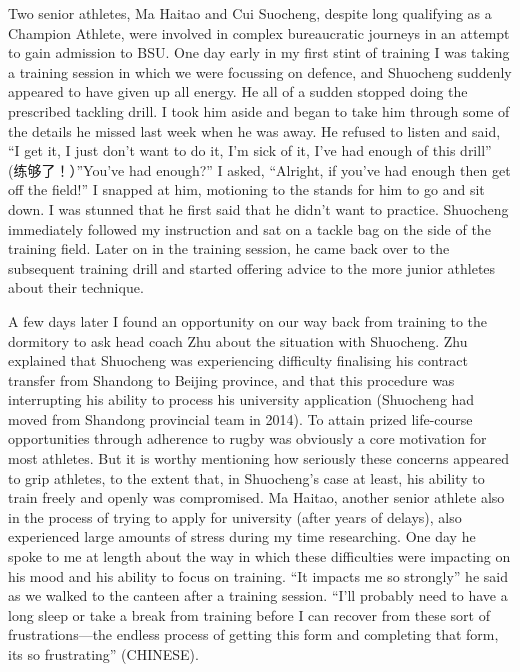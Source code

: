 \begin{CJK}{UTF8}{gbsn}
Two senior athletes, Ma Haitao and Cui Suocheng, despite long qualifying as a Champion Athlete, were involved in complex bureaucratic journeys in an attempt to gain admission to BSU.  One day early in my first stint of training I was taking a training session in which we were focussing on defence, and Shuocheng suddenly appeared to have given up all energy.  He all of a sudden stopped doing the prescribed tackling drill.  I took him aside and began to take him through some of the details he missed last week when he was away.  He refused to listen and said, ``I get it, I just don’t want to do it, I’m sick of it, I’ve had enough of this drill'' (练够了！）''You’ve had enough?'' I asked, ``Alright, if you’ve had enough then get off the field!''  I snapped at him, motioning to the stands for him to go and sit down. I was stunned that he first said that he didn’t want to practice.  Shuocheng immediately followed my instruction and sat on a tackle bag on the side of the training field.  Later on in the training session, he came back over to the subsequent training drill and started offering advice to the more junior athletes about their technique.

A few days later I found an opportunity on our way back from training to the dormitory to ask head coach Zhu about the situation with Shuocheng.  Zhu explained that Shuocheng was experiencing difficulty finalising his contract transfer from Shandong to Beijing province, and that this procedure was interrupting his ability to process his university application (Shuocheng had moved from Shandong provincial team in 2014). To attain prized life-course opportunities through adherence to rugby was obviously a core motivation for most athletes.  But it is worthy mentioning how seriously these concerns appeared to grip athletes, to the extent that, in Shuocheng's case at least, his ability to train freely and openly was compromised.  Ma Haitao, another senior athlete also in the process of trying to apply for university (after years of delays), also experienced large amounts of stress during my time researching.  One day he spoke to me at length about the way in which these difficulties were impacting on his mood and his ability to focus on training. ``It impacts me so strongly'' he said as we walked to the canteen after a training session.  ``I’ll probably need to have a long sleep or take a break from training before I can recover from these sort of frustrations---the endless process of getting this form and completing that form, its so frustrating'' (CHINESE).


\end{CJK}
